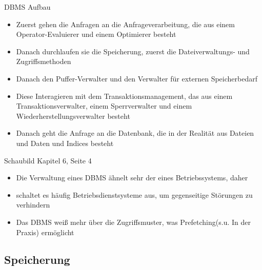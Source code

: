 \documentclass{article}
\begin{document}
\begin{block}{DBMS Aufbau}
  \begin{itemize}
    \item Zuerst gehen die Anfragen an die Anfrageverarbeitung, die aus einem Operator-Evaluierer und einem Optimierer besteht
    \item Danach durchlaufen sie die Speicherung, zuerst die Dateiverwaltungs- und Zugriffsmethoden
    \item Danach den Puffer-Verwalter und den Verwalter für externen Speicherbedarf
    \item Diese Interagieren mit dem Transaktionsmanagement, das aus einem Transaktionsverwalter, einem Sperrverwalter und einem Wiederherstellungsverwalter besteht
    \item Danach geht die Anfrage an die Datenbank, die in der Realität aus Dateien und Daten und Indices besteht
  \end{itemize}
  Schaubild Kapitel 6, Seite 4
  \begin{itemize}
    \item Die Verwaltung eines DBMS ähnelt sehr der eines Betriebssystems, daher
    \item schaltet es häufig Betriebsdienstsysteme aus, um gegenseitige Störungen zu verhindern
    \item Das DBMS weiß mehr über die Zugriffsmuster, was Prefetching(s.u. In der Praxis) ermöglicht
  \end{itemize}
\end{block}

\subsection*{Speicherung}
\end{document}
